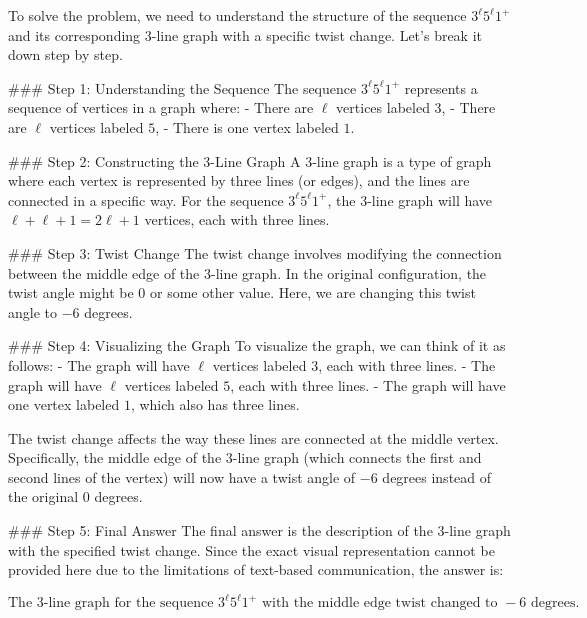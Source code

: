 To solve the problem, we need to understand the structure of the sequence \(3^\ell 5^\ell 1^+\) and its corresponding 3-line graph with a specific twist change. Let's break it down step by step.

### Step 1: Understanding the Sequence
The sequence \(3^\ell 5^\ell 1^+\) represents a sequence of vertices in a graph where:
- There are \(\ell\) vertices labeled \(3\),
- There are \(\ell\) vertices labeled \(5\),
- There is one vertex labeled \(1\).

### Step 2: Constructing the 3-Line Graph
A 3-line graph is a type of graph where each vertex is represented by three lines (or edges), and the lines are connected in a specific way. For the sequence \(3^\ell 5^\ell 1^+\), the 3-line graph will have \(\ell + \ell + 1 = 2\ell + 1\) vertices, each with three lines.

### Step 3: Twist Change
The twist change involves modifying the connection between the middle edge of the 3-line graph. In the original configuration, the twist angle might be \(0\) or some other value. Here, we are changing this twist angle to \(-6\) degrees.

### Step 4: Visualizing the Graph
To visualize the graph, we can think of it as follows:
- The graph will have \(\ell\) vertices labeled \(3\), each with three lines.
- The graph will have \(\ell\) vertices labeled \(5\), each with three lines.
- The graph will have one vertex labeled \(1\), which also has three lines.

The twist change affects the way these lines are connected at the middle vertex. Specifically, the middle edge of the 3-line graph (which connects the first and second lines of the vertex) will now have a twist angle of \(-6\) degrees instead of the original \(0\) degrees.

### Step 5: Final Answer
The final answer is the description of the 3-line graph with the specified twist change. Since the exact visual representation cannot be provided here due to the limitations of text-based communication, the answer is:

\[
\boxed{\text{The 3-line graph for the sequence } 3^\ell 5^\ell 1^+ \text{ with the middle edge twist changed to } -6 \text{ degrees.}}
\]